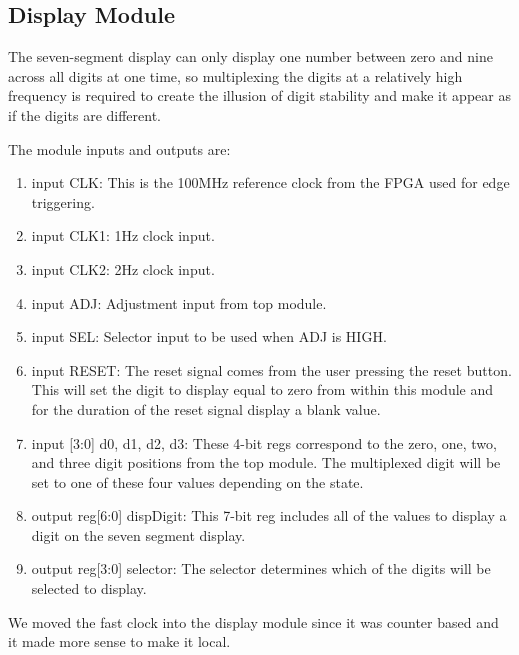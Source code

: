 \documentclass[journal]{IEEEtran}
\begin{document}
\subsection{Display Module}
The seven-segment display can only display one number between zero and nine across all digits at one time, so multiplexing the digits at a relatively high frequency is required to create the illusion of digit stability and make it appear as if the digits are different. 
\par
The module inputs and outputs are:
\begin{enumerate}
	\item input CLK: This is the 100MHz reference clock from the FPGA used for edge triggering.
	\item input CLK1: 1Hz clock input.
	\item input CLK2: 2Hz clock input.
	\item input ADJ:  Adjustment input from top module.
	\item input SEL:  Selector input to be used when ADJ is HIGH.
	\item input RESET: The reset signal comes from the user pressing the reset button. This will set the digit to display equal to zero from within this module and for the duration of the reset signal display a blank value.
	\item input [3:0] d0, d1, d2, d3: These 4-bit regs correspond to the zero, one, two, and three digit positions from the top module. The multiplexed digit will be set to one of these four values depending on the state.
	\item output reg[6:0] dispDigit: This 7-bit reg includes all of the values to display a digit on the seven segment display.
	\item output reg[3:0] selector: The selector determines which of the digits will be selected to display.
\end{enumerate}
We moved the fast clock into the display module since it was counter based and it made more sense to make it local. 
\end{document}

